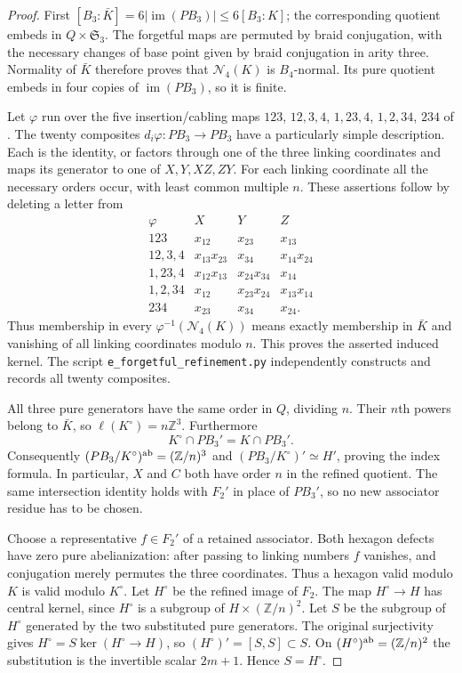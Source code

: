 \begin{proof}
First $[B_3:\bar K]=6|\operatorname{im}(PB_3)|\leq6[B_3:K]$;
the corresponding quotient embeds in $Q\times\mathfrak S_3$.
The forgetful maps are permuted by braid conjugation, with the
necessary changes of base point given by braid conjugation in
arity three. Normality of $\bar K$ therefore proves that
$\mathcal N_4(K)$ is $B_4$-normal. Its pure quotient embeds in
four copies of $\operatorname{im}(PB_3)$, so it is finite.

Let $\varphi$ run over the five insertion/cabling maps
$123$, $12,3,4$, $1,23,4$, $1,2,34$, $234$ of
\citet[(A.16)--(A.18)]{DolgushevLeLorenz2024}.
The twenty composites $d_i\varphi:PB_3\to PB_3$ have a particularly
simple description. Each is the identity, or factors through one
of the three linking coordinates and maps its generator to one
of $X,Y,XZ,ZY$. For each linking coordinate all the necessary
orders occur, with least common multiple $n$.
These assertions follow by deleting a letter from
\[
\begin{array}{c|ccc}
\varphi&X&Y&Z\\\hline
123&x_{12}&x_{23}&x_{13}\\
12,3,4&x_{13}x_{23}&x_{34}&x_{14}x_{24}\\
1,23,4&x_{12}x_{13}&x_{24}x_{34}&x_{14}\\
1,2,34&x_{12}&x_{23}x_{24}&x_{13}x_{14}\\
234&x_{23}&x_{34}&x_{24}.
\end{array}
\]
Thus membership in every $\varphi^{-1}(\mathcal N_4(K))$ means
exactly membership in $\bar K$ and vanishing of all linking
coordinates modulo $n$. This proves the asserted induced kernel.
The script \texttt{e\_forgetful\_refinement.py} independently
constructs and records all twenty composites.

All three pure generators have the same order in $Q$, dividing
$n$. Their $n$th powers belong to $\bar K$, so
$\ell(K^\circ)=n\mathbb Z^3$. Furthermore
\[
 K^\circ\cap PB_3'=K\cap PB_3'.
\]
Consequently $(PB_3/K^\circ)^{\rm ab}=(\mathbb Z/n)^3$ and
$(PB_3/K^\circ)'\simeq H'$, proving the index formula.
In particular, $X$ and $C$ both have order $n$ in the refined
quotient. The same intersection identity holds with $F_2'$ in
place of $PB_3'$, so no new associator residue has to be chosen.

Choose a representative $f\in F_2'$ of a retained associator.
Both hexagon defects have zero pure abelianization: after passing
to linking numbers $f$ vanishes, and conjugation merely permutes
the three coordinates. Thus a hexagon valid modulo $K$ is valid
modulo $K^\circ$. Let $H^\circ$ be the refined image of $F_2$.
The map $H^\circ\to H$ has central kernel, since $H^\circ$ is a
subgroup of $H\times(\mathbb Z/n)^2$. Let $S$ be the subgroup
of $H^\circ$ generated by the two substituted pure generators.
The original surjectivity gives $H^\circ=S\ker(H^\circ\to H)$,
so $(H^\circ)'=[S,S]\subset S$. On
$(H^\circ)^{\rm ab}=(\mathbb Z/n)^2$ the substitution is the
invertible scalar $2m+1$. Hence $S=H^\circ$.


\end{proof}
